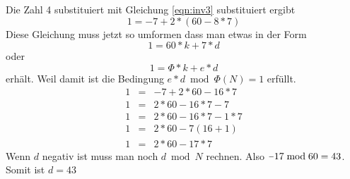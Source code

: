 Die Zahl 4 substituiert mit Gleichung \ref{eqn:inv3} substituiert ergibt
\begin{equation}
1 = -7 + 2*(60-8*7)
\end{equation}
Diese Gleichung muss jetzt so umformen dass man etwas in der Form
\begin{equation*}
1 = 60*k + 7*d
\end{equation*}
oder
\begin{equation*}
1 = \Phi*k + e*d
\end{equation*}
erhält. Weil damit ist die Bedingung $e*d \bmod \Phi(N) = 1$ erfüllt.
\begin{eqnarray}
1 & = & -7 + 2*60-16*7 \\
1 & = & 2 * 60-16*7-7 \\
1 & = & 2 * 60-16*7-1*7\\
1 & = & 2 * 60-7(16+1)\\
1 & = & 2 * 60-17*7
\end{eqnarray}
Wenn $d$ negativ ist muss man noch $d \bmod N$ rechnen. Also $\unaryminus 17
\bmod 60 = 43$.  Somit ist $d = 43$
